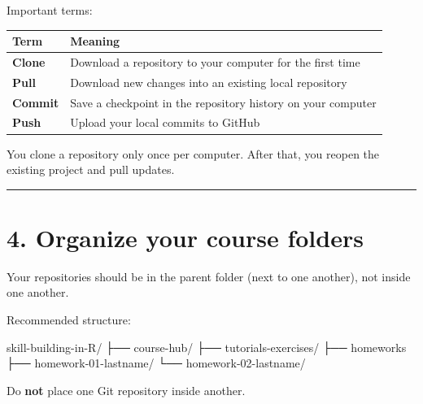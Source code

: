 \documentclass[
  letterpaper,
  DIV=11,
  numbers=noendperiod]{scrartcl}
\newenvironment{Shaded}{\begin{snugshade}}{\end{snugshade}}
\newcommand{\NormalTok}[1]{\textcolor[rgb]{0.00,0.23,0.31}{#1}}
\newcounter{none} %
\begin{document}
Important terms:

{\def\LTcaptype{none} %
\begin{longtable}[]{@{}
  >{\raggedright\arraybackslash}p{}
  >{\raggedright\arraybackslash}p{}@{}}
\toprule\noalign{}
\begin{minipage}[b]{\linewidth}\raggedright
Term
\end{minipage} & \begin{minipage}[b]{\linewidth}\raggedright
Meaning
\end{minipage} \\
\midrule\noalign{}
\endhead
\bottomrule\noalign{}
\endlastfoot
\textbf{Clone} & Download a repository to your computer for the first
time \\
\textbf{Pull} & Download new changes into an existing local
repository \\
\textbf{Commit} & Save a checkpoint in the repository history on your
computer \\
\textbf{Push} & Upload your local commits to GitHub \\
\end{longtable}
}

You clone a repository only once per computer. After that, you reopen
the existing project and pull updates.

\begin{center}\rule{0.5\linewidth}{0.5pt}\end{center}

\section{4. Organize your course
folders}\label{organize-your-course-folders}

Your repositories should be in the parent folder (next to one another),
not inside one another.

Recommended structure:

\begin{Shaded}
\begin{Highlighting}[]
\NormalTok{skill{-}building{-}in{-}R/}
\NormalTok{├── course{-}hub/}
\NormalTok{├── tutorials{-}exercises/}
\NormalTok{├── homeworks}
\NormalTok{    ├── homework{-}01{-}lastname/}
\NormalTok{    └── homework{-}02{-}lastname/}
\end{Highlighting}
\end{Shaded}

Do \textbf{not} place one Git repository inside another.
\end{document}
